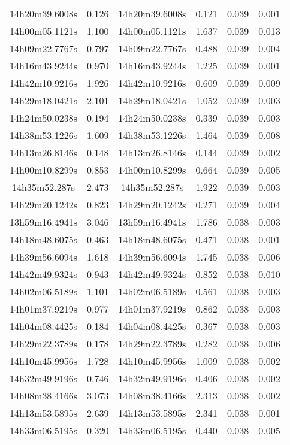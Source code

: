 \begin{table}
\begin{tabular}{cccccc}
14h20m39.6008s & 0.126 & 14h20m39.6008s & 0.121 & 0.039 & 0.001 \\
14h00m05.1121s & 1.100 & 14h00m05.1121s & 1.637 & 0.039 & 0.013 \\
14h09m22.7767s & 0.797 & 14h09m22.7767s & 0.488 & 0.039 & 0.004 \\
14h16m43.9244s & 0.970 & 14h16m43.9244s & 1.225 & 0.039 & 0.001 \\
14h42m10.9216s & 1.926 & 14h42m10.9216s & 0.609 & 0.039 & 0.009 \\
14h29m18.0421s & 2.101 & 14h29m18.0421s & 1.052 & 0.039 & 0.003 \\
14h24m50.0238s & 0.194 & 14h24m50.0238s & 0.339 & 0.039 & 0.003 \\
14h38m53.1226s & 1.609 & 14h38m53.1226s & 1.464 & 0.039 & 0.008 \\
14h13m26.8146s & 0.148 & 14h13m26.8146s & 0.144 & 0.039 & 0.002 \\
14h00m10.8299s & 0.853 & 14h00m10.8299s & 0.664 & 0.039 & 0.005 \\
14h35m52.287s & 2.473 & 14h35m52.287s & 1.922 & 0.039 & 0.003 \\
14h29m20.1242s & 0.823 & 14h29m20.1242s & 0.271 & 0.039 & 0.004 \\
13h59m16.4941s & 3.046 & 13h59m16.4941s & 1.786 & 0.038 & 0.003 \\
14h18m48.6075s & 0.463 & 14h18m48.6075s & 0.471 & 0.038 & 0.001 \\
14h39m56.6094s & 1.618 & 14h39m56.6094s & 1.745 & 0.038 & 0.006 \\
14h42m49.9324s & 0.943 & 14h42m49.9324s & 0.852 & 0.038 & 0.010 \\
14h02m06.5189s & 1.101 & 14h02m06.5189s & 0.561 & 0.038 & 0.003 \\
14h01m37.9219s & 0.977 & 14h01m37.9219s & 0.862 & 0.038 & 0.003 \\
14h04m08.4425s & 0.184 & 14h04m08.4425s & 0.367 & 0.038 & 0.003 \\
14h29m22.3789s & 0.178 & 14h29m22.3789s & 0.282 & 0.038 & 0.006 \\
14h10m45.9956s & 1.728 & 14h10m45.9956s & 1.009 & 0.038 & 0.002 \\
14h32m49.9196s & 0.746 & 14h32m49.9196s & 0.406 & 0.038 & 0.002 \\
14h08m38.4166s & 3.073 & 14h08m38.4166s & 2.313 & 0.038 & 0.002 \\
14h13m53.5895s & 2.639 & 14h13m53.5895s & 2.341 & 0.038 & 0.001 \\
14h33m06.5195s & 0.320 & 14h33m06.5195s & 0.440 & 0.038 & 0.005 \\

\end{tabular}
\end{table}
